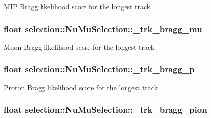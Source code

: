 M\-I\-P Bragg likelihood score for the longest track \hypertarget{classselection_1_1NuMuSelection_a51cf3e575038967284eb7ff10eeba9e0}{
\subsubsection[{\-\_\-trk\-\_\-bragg\-\_\-mu}]{\setlength{\rightskip}{0pt plus 5cm}float selection\-::\-Nu\-Mu\-Selection\-::\-\_\-trk\-\_\-bragg\-\_\-mu\hspace{0.3cm}{\ttfamily [private]}}}\label{classselection_1_1NuMuSelection_a51cf3e575038967284eb7ff10eeba9e0}
Muon Bragg likelihood score for the longest track \hypertarget{classselection_1_1NuMuSelection_a14e0373dc5bdb3b21399f45b7313294c}{
\subsubsection[{\-\_\-trk\-\_\-bragg\-\_\-p}]{\setlength{\rightskip}{0pt plus 5cm}float selection\-::\-Nu\-Mu\-Selection\-::\-\_\-trk\-\_\-bragg\-\_\-p\hspace{0.3cm}{\ttfamily [private]}}}\label{classselection_1_1NuMuSelection_a14e0373dc5bdb3b21399f45b7313294c}
Proton Bragg likelihood score for the longest track \hypertarget{classselection_1_1NuMuSelection_ae68f8cd5aba5ad848ac6ef0576ce6039}{
\subsubsection[{\-\_\-trk\-\_\-bragg\-\_\-pion}]{\setlength{\rightskip}{0pt plus 5cm}float selection\-::\-Nu\-Mu\-Selection\-::\-\_\-trk\-\_\-bragg\-\_\-pion\hspace{0.3cm}{\ttfamily [private]}}}\label{classselection_1_1NuMuSelection_ae68f8cd5aba5ad848ac6ef0576ce6039}
